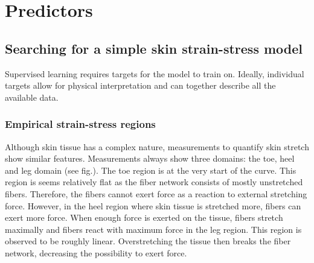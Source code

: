 \section{Predictors}\label{sec:skin_predictors}


\subsection{Searching for a simple skin strain-stress model}

Supervised learning requires targets for the model to train on.
Ideally, individual targets allow for physical interpretation and can together describe all the available data.

\subsubsection{Empirical strain-stress regions}
Although skin tissue has a complex nature, measurements to quantify skin stretch show similar features.
Measurements always show three domains: the toe, heel and leg domain (see fig.).
The toe region is at the very start of the curve.
This region is seems relatively flat as the fiber network consists of mostly unstretched fibers.
Therefore, the fibers cannot exert force as a reaction to external stretching force.
However, in the heel region where skin tissue is stretched more, fibers can exert more force.
When enough force is exerted on the tissue, fibers stretch maximally and fibers react with maximum force in the leg region.
This region is observed to be roughly linear.
Overstretching the tissue then breaks the fiber network, decreasing the possibility to exert force.

